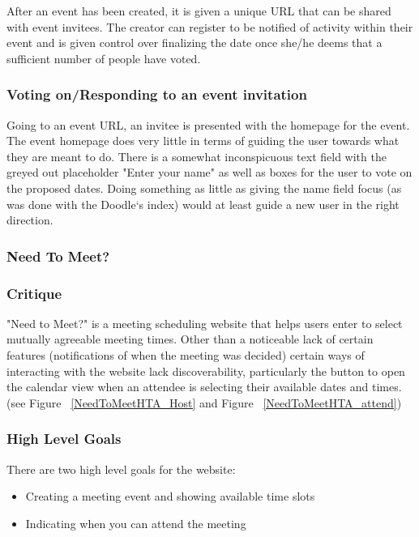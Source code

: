 \documentclass{sigchi}
\begin{document}
After an event has been created, it is given a unique URL that can
be shared with event invitees. The creator can register to be
notified of activity within their event and is given control over
finalizing the date once she/he deems that a sufficient number of
people have voted.

\subsubsection{Voting on/Responding to an event invitation}

Going to an event URL, an invitee is presented with the homepage for
the event. The event homepage does very little in terms of guiding
the user towards what they are meant to do. There is a somewhat
inconspicuous text field with the greyed out placeholder "Enter your
name" as well as boxes for the user to vote on the proposed
dates. Doing something as little as giving the name field focus (as
was done with the Doodle`s index) would at least guide a new user in
the right direction.
\FloatBarrier
\subsubsection{Need To Meet?}
\FloatBarrier

\subsubsection{Critique}
"Need to Meet?" is a meeting scheduling website that helps users
enter to select mutually agreeable meeting times. Other than a noticeable 
lack of certain features (notifications of when the meeting was decided)
certain ways of interacting with the website lack discoverability, particularly
the button to open the calendar view when an attendee is selecting their available
dates and times. (see Figure ~\ref{NeedToMeetHTA_Host} and Figure ~\ref{NeedToMeetHTA_attend})
\subsubsection{High Level Goals}
There are two high level goals for the website:
\begin{itemize}
	\item Creating a meeting event and showing available time slots
	\item Indicating when you can attend the meeting
\end{itemize}
\end{document}

